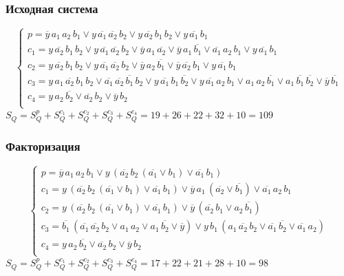\documentclass[12pt,a4paper]{report}
\begin{document}
\subsubsection*{Исходная система}
\begin{equation*}
    \begin{cases}
        p=\overline{y}\,a_1\,a_2\,b_1 \lor y\,\overline{a_1}\,\overline{a_2}\,b_2 \lor y\,\overline{a_2}\,b_1\,b_2 \lor y\,\overline{a_1}\,b_1\\
        c_1=y\,\overline{a_2}\,b_1\,b_2 \lor y\,\overline{a_1}\,\overline{a_2}\,b_2 \lor \overline{y}\,a_1\,\overline{a_2} \lor \overline{y}\,a_1\,\overline{b_1} \lor \overline{a_1}\,a_2\,b_1 \lor y\,\overline{a_1}\,b_1\\
        c_2=y\,\overline{a_2}\,b_1\,b_2 \lor y\,\overline{a_1}\,\overline{a_2}\,b_2 \lor  \overline{y}\,a_2\,\overline{b_1} \lor \overline{y}\,\overline{a_2}\,b_1 \lor y\,\overline{a_1}\,b_1\\
        c_3=y\,a_1\,\overline{a_2}\,b_1\,b_2 \lor \overline{a_1}\,\overline{a_2}\,\overline{b_1}\,b_2 \lor y\,\overline{a_1}\,b_1\,\overline{b_2} \lor y\,\overline{a_1}\,a_2\,b_1 \lor a_1\,a_2\,\overline{b_1} \lor a_1\,\overline{b_1}\,\overline{b_2} \lor \overline{y}\,\overline{b_1}\\
        c_4=y\,a_2\,\overline{b_2} \lor \overline{a_2}\,b_2 \lor \overline{y}\,b_2\\
    \end{cases}
\end{equation*}
$S_Q=S_Q^p+S_Q^{c_1}+S_Q^{c_2}+S_Q^{c_3}+S_Q^{c_4}=19+26+22+32+10=109$
\subsubsection*{Факторизация}
\begin{equation*}
    \begin{cases}
        p=\overline{y}\,a_1\,a_2\,b_1 \lor y\,(\overline{a_2}\,b_2\,(\overline{a_1} \lor b_1) \lor \overline{a_1}\,b_1)\\
        c_1=y\,(\overline{a_2}\,b_2\,(\overline{a_1} \lor b_1) \lor \overline{a_1}\,b_1) \lor \overline{y}\,a_1\,(\overline{a_2}\lor\overline{b_1})\lor \overline{a_1}\,a_2\,b_1\\
        c_2=y\,(\overline{a_2}\,b_2\,(\overline{a_1} \lor b_1) \lor \overline{a_1}\,b_1) \lor \overline{y}\,(\overline{a_2}\,b_1 \lor a_2\,\overline{b_1})\\
        c_3=\overline{b_1}\,(\overline{a_1}\,\overline{a_2}\,b_2 \lor a_1\,a_2 \lor a_1\,\overline{b_2} \lor \overline{y}) \lor y\,b_1\,(a_1\,\overline{a_2}\,b_2\lor\overline{a_1}\,\overline{b_2}\lor\overline{a_1}\,a_2)\\
        c_4=y\,a_2\,\overline{b_2} \lor \overline{a_2}\,b_2 \lor \overline{y}\,b_2\\
    \end{cases}
\end{equation*}
$S_Q=S_Q^p+S_Q^{c_1}+S_Q^{c_2}+S_Q^{c_3}+S_Q^{c_4}=17+22+21+28+10=98$
\end{document}
